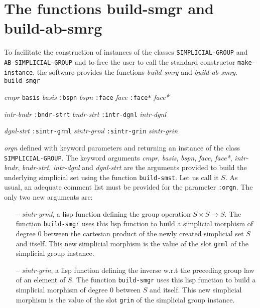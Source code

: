\section {The functions build-smgr and build-ab-smrg}

To facilitate the construction of instances of
the classes {\tt SIMPLICIAL-GROUP} and {\tt AB-SIMPLICIAL-GROUP} and to free  the user to call
the standard constructor {\tt make-instance}, the software provides the functions
{\em build-smrg} and {\em build-ab-smrg}.
\vskip 0.35cm
{\tt build-smgr}\par
\hspace {0.60cm}{\tt :cmpr} {\em cmpr} {\tt basis} {\em basis} {\tt :bspn} {\em bspn} {\tt :face} {\em face}
             {\tt :face*} {\em face*}  \par
\hspace {0.60cm}{\tt :intr-bndr} {\em intr-bndr} {\tt :bndr-strt} {\em bndr-strt} {\tt :intr-dgnl} {\em intr-dgnl} \par
\hspace {0.60cm}{\tt :dgnl-strt} {\em dgnl-strt} {\tt :sintr-grml} {\em sintr-grml} {\tt :sintr-grin} {\em sintr-grin} \par
\hspace {0.60cm}{\tt :orgn} {\em orgn}
\vskip 0.35cm
defined with keyword parameters and returning an instance of the class {\tt SIMPLICIAL-GROUP}.
The keyword arguments {\em cmpr}, {\em basis}, {\em bspn}, {\em face}, {\em face*}, {\em intr-bndr},
{\em bndr-strt}, {\em intr-dgnl} and {\em dgnl-strt} are the arguments provided to build the underlying
simplicial set using the function {\tt build-smst}. Let us call it  $S$.
As usual,  an adequate comment list must be provided for the parameter {\tt :orgn}. The only two new arguments are:
\begin{itemize}
\item[--] {\em sintr-grml}, a  lisp function defining the group operation $S \times S \longrightarrow S$. The function
{\tt build-smgr} uses this lisp function to build a simplicial morphism of degree $0$ between the cartesian product
of the newly created simplicial set $S$ and itself. This new simplicial morphism is the value of the
slot {\tt grml} of the simplicial group instance.
\item[--] {\em sintr-grin}, a  lisp function defining the inverse w.r.t the preceding group law of
an element of $S$. The function
{\tt build-smgr} uses this lisp function to build a simplicial morphism of degree $0$ between
$S$ and itself. This new simplicial morphism is the value of the
slot {\tt grin} of the simplicial group instance.
\end{itemize}
